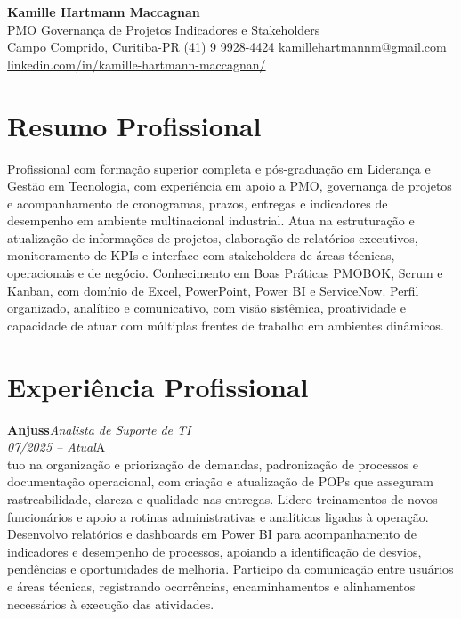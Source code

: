 \documentclass[11pt,a4paper]{article}
\newcommand{\cvrole}[4]{%
  \vspace{4pt}%
  {\bfseries\color{accentcolor}#1}\hfill{\itshape #2}\\[-2pt]%
  {\itshape #3}\hfill #4\\[6pt]%
}
\begin{document}
\begin{center}
  {\fontsize{20}{24}\selectfont\bfseries Kamille Hartmann Maccagnan}\\[8pt]
  {\large PMO \textbar{} Governança de Projetos \textbar{} Indicadores e Stakeholders}\\[10pt]
  Campo Comprido, Curitiba-PR \enspace\textbullet\enspace (41) 9 9928-4424 \enspace\textbullet\enspace
  \href{mailto:kamillehartmannm@gmail.com}{kamillehartmannm@gmail.com}\\[3pt]
  \href{https://linkedin.com/in/kamille-hartmann-maccagnan/}{linkedin.com/in/kamille-hartmann-maccagnan/}
\end{center}

\vspace{6pt}

\section{Resumo Profissional}

Profissional com formação superior completa e pós-graduação em Liderança e Gestão em Tecnologia, com experiência em apoio a PMO, governança de projetos e acompanhamento de cronogramas, prazos, entregas e indicadores de desempenho em ambiente multinacional industrial. Atua na estruturação e atualização de informações de projetos, elaboração de relatórios executivos, monitoramento de KPIs e interface com stakeholders de áreas técnicas, operacionais e de negócio. Conhecimento em Boas Práticas PMOBOK, Scrum e Kanban, com domínio de Excel, PowerPoint, Power BI e ServiceNow. Perfil organizado, analítico e comunicativo, com visão sistêmica, proatividade e capacidade de atuar com múltiplas frentes de trabalho em ambientes dinâmicos.

\section{Experiência Profissional}

\cvrole{Anjuss}{Analista de Suporte de TI}{07/2025 -- Atual}

Atuo na organização e priorização de demandas, padronização de processos e documentação operacional, com criação e atualização de POPs que asseguram rastreabilidade, clareza e qualidade nas entregas. Lidero treinamentos de novos funcionários e apoio a rotinas administrativas e analíticas ligadas à operação. Desenvolvo relatórios e dashboards em Power BI para acompanhamento de indicadores e desempenho de processos, apoiando a identificação de desvios, pendências e oportunidades de melhoria. Participo da comunicação entre usuários e áreas técnicas, registrando ocorrências, encaminhamentos e alinhamentos necessários à execução das atividades.
\end{document}

